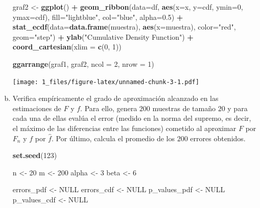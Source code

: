 \documentclass[a4paper]{article}
\newenvironment{Shaded}{\begin{snugshade}}{\end{snugshade}}
\newcommand{\DataTypeTok}[1]{\textcolor[rgb]{0.13,0.29,0.53}{#1}}
\newcommand{\DecValTok}[1]{\textcolor[rgb]{0.00,0.00,0.81}{#1}}
\newcommand{\FloatTok}[1]{\textcolor[rgb]{0.00,0.00,0.81}{#1}}
\newcommand{\KeywordTok}[1]{\textcolor[rgb]{0.13,0.29,0.53}{\textbf{#1}}}
\newcommand{\NormalTok}[1]{#1}
\newcommand{\OperatorTok}[1]{\textcolor[rgb]{0.81,0.36,0.00}{\textbf{#1}}}
\newcommand{\OtherTok}[1]{\textcolor[rgb]{0.56,0.35,0.01}{#1}}
\newcommand{\StringTok}[1]{\textcolor[rgb]{0.31,0.60,0.02}{#1}}
\begin{document}
\begin{enumerate}[a)]
\begin{Shaded}
\begin{Highlighting}[]
\NormalTok{graf2 <-}\StringTok{ }\KeywordTok{ggplot}\NormalTok{() }\OperatorTok{+}
\StringTok{  }\KeywordTok{geom_ribbon}\NormalTok{(}\DataTypeTok{data=}\NormalTok{df, }\KeywordTok{aes}\NormalTok{(}\DataTypeTok{x=}\NormalTok{x, }\DataTypeTok{y=}\NormalTok{cdf, }\DataTypeTok{ymin=}\DecValTok{0}\NormalTok{, }\DataTypeTok{ymax=}\NormalTok{cdf),}
\DataTypeTok{fill=}\StringTok{"lightblue"}\NormalTok{, }\DataTypeTok{col=}\StringTok{"blue"}\NormalTok{, }\DataTypeTok{alpha=}\FloatTok{0.5}\NormalTok{) }\OperatorTok{+}
\StringTok{  }\KeywordTok{stat_ecdf}\NormalTok{(}\DataTypeTok{data=}\KeywordTok{data.frame}\NormalTok{(muestra), }\KeywordTok{aes}\NormalTok{(}\DataTypeTok{x=}\NormalTok{muestra), }\DataTypeTok{color=}\StringTok{"red"}\NormalTok{, }\DataTypeTok{geom=}\StringTok{"step"}\NormalTok{) }\OperatorTok{+}
\StringTok{  }\KeywordTok{ylab}\NormalTok{(}\StringTok{"Cumulative Density Function"}\NormalTok{) }\OperatorTok{+}
\StringTok{  }\KeywordTok{coord_cartesian}\NormalTok{(}\DataTypeTok{xlim =} \KeywordTok{c}\NormalTok{(}\DecValTok{0}\NormalTok{, }\DecValTok{1}\NormalTok{))}

\KeywordTok{ggarrange}\NormalTok{(graf1, graf2, }\DataTypeTok{ncol =} \DecValTok{2}\NormalTok{, }\DataTypeTok{nrow =} \DecValTok{1}\NormalTok{)}
\end{Highlighting}
\end{Shaded}

	\texttt{[image: 1\_files/figure-latex/unnamed-chunk-3-1.pdf]}
	
	\item Verifica empíricamente el grado de aproximación alcanzado en las estimaciones de $F$
	y $f$. Para ello, genera $200$ muestras de tamaño $20$ y para cada una de ellas evalúa el
	error (medido en la norma del supremo, es decir, el máximo de las diferencias entre las
	funciones) cometido al aproximar $F$ por $F_n$ y $f$ por $\hat f$. Por último, calcula el promedio
	de los $200$ errores obtenidos.

\begin{Shaded}
\begin{Highlighting}[]
\KeywordTok{set.seed}\NormalTok{(}\DecValTok{123}\NormalTok{)}

\NormalTok{n <-}\StringTok{ }\DecValTok{20}
\NormalTok{m <-}\StringTok{ }\DecValTok{200}
\NormalTok{alpha <-}\StringTok{ }\DecValTok{3}
\NormalTok{beta <-}\StringTok{ }\DecValTok{6}

\NormalTok{errors_pdf <-}\StringTok{ }\OtherTok{NULL}
\NormalTok{errors_cdf <-}\StringTok{ }\OtherTok{NULL}
\NormalTok{p_values_pdf <-}\StringTok{ }\OtherTok{NULL}
\NormalTok{p_values_cdf <-}\StringTok{ }\OtherTok{NULL}


\end{Highlighting}
\end{Shaded}
\end{enumerate}
\end{document}
